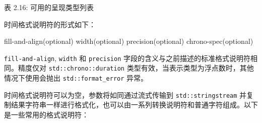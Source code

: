 \begin{center}
表 2.16: 可用的呈现类型列表
\end{center}

时间格式说明符的形式如下：

\begin{shell}
fill-and-align(optional) width(optional) precision(optional) chrono-spec(optional)
\end{shell}

\verb|fill-and-align|, \verb|width| 和 \verb|precision| 字段的含义与之前描述的标准格式说明符相同。精度仅对 \verb|std::chrono::duration| 类型有效，当表示类型为浮点数时，其他情况下使用会抛出 \verb|std::format_error| 异常。

时间格式说明符可以为空，参数将如同通过流式传输到 \verb|std::stringstream| 并复制结果字符串一样进行格式化，也可以由一系列转换说明符和普通字符组成。以下是一些常用的格式说明符：

